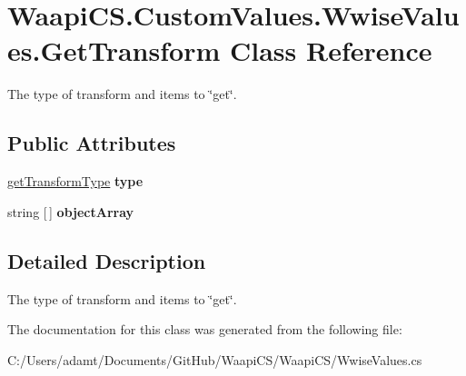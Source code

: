 \hypertarget{class_waapi_c_s_1_1_custom_values_1_1_wwise_values_1_1_get_transform}{}\section{Waapi\+C\+S.\+Custom\+Values.\+Wwise\+Values.\+Get\+Transform Class Reference}
\label{class_waapi_c_s_1_1_custom_values_1_1_wwise_values_1_1_get_transform}


The type of transform and items to \char`\"{}get\char`\"{}.  


\subsection*{Public Attributes}
\begin{DoxyCompactItemize}
\item 
\mbox{\label{class_waapi_c_s_1_1_custom_values_1_1_wwise_values_1_1_get_transform_a19479c987166f6d8e75b8a589de0e3d5}} 
\mbox{\hyperlink{class_waapi_c_s_1_1_custom_values_1_1_wwise_values_aa760e1a314fbb9fa38c1f8abd6267b16}{get\+Transform\+Type}} {\bfseries type}
\item 
\mbox{\label{class_waapi_c_s_1_1_custom_values_1_1_wwise_values_1_1_get_transform_a6ecf6d08cd89cdcac47551c40aad95e3}} 
string \mbox{[}$\,$\mbox{]} {\bfseries object\+Array}
\end{DoxyCompactItemize}


\subsection{Detailed Description}
The type of transform and items to \char`\"{}get\char`\"{}. 



The documentation for this class was generated from the following file\+:\begin{DoxyCompactItemize}
\item 
C\+:/\+Users/adamt/\+Documents/\+Git\+Hub/\+Waapi\+C\+S/\+Waapi\+C\+S/Wwise\+Values.\+cs\end{DoxyCompactItemize}
